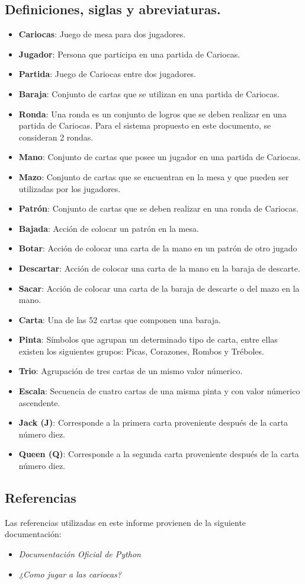 \subsection{Definiciones, siglas y abreviaturas.}\label{cap:definiciones} 
\begin{itemize}
    \item \textbf{Cariocas}: Juego de mesa para dos jugadores.
    \item \textbf{Jugador}: Persona que participa en una partida de Cariocas.
    \item \textbf{Partida}: Juego de Cariocas entre dos jugadores.
    \item \textbf{Baraja}: Conjunto de cartas que se utilizan en una partida de Cariocas.
    \item \textbf{Ronda}: Una ronda es un conjunto de logros que se deben realizar en una partida de Cariocas. Para el sistema propuesto en este documento, se consideran 2 rondas.
    \item \textbf{Mano}: Conjunto de cartas que posee un jugador en una partida de Cariocas.
    \item \textbf{Mazo}: Conjunto de cartas que se encuentran en la mesa y que pueden ser utilizadas por los jugadores.
    \item \textbf{Patrón}: Conjunto de cartas que se deben realizar en una ronda de Cariocas.
    \item \textbf{Bajada}: Acción de colocar un patrón en la mesa.
    \item \textbf{Botar}: Acción de colocar una carta de la mano en un patrón de otro jugado
    \item \textbf{Descartar}: Acción de colocar una carta de la mano en la baraja de descarte.
    \item \textbf{Sacar}: Acción de colocar una carta de la baraja de descarte o del mazo en la mano.
    \item \textbf{Carta}: Una de las 52 cartas que componen una baraja.
    \item \textbf{Pinta}: Símbolos que agrupan un determinado tipo de carta, entre ellas existen los siguientes grupos: Picas, Corazones, Rombos y Tréboles.
    \item \textbf{Trio}: Agrupación de tres cartas de un mismo valor númerico.
    \item \textbf{Escala}: Secuencia de cuatro cartas de una misma pinta y con valor númerico ascendente.
    \item \textbf{Jack (J)}: Corresponde a la primera carta proveniente después de la carta número diez.
    \item \textbf{Queen (Q)}: Corresponde a la segunda carta proveniente después de la carta número diez.
\end{itemize} 

\subsection{Referencias}
Las referencias utilizadas en este informe provienen de la siguiente documentación:
\begin{itemize}
    \item \textit{Documentación Oficial de Python} \cite{python}
    \item \textit{¿Como jugar a las cariocas?} \cite{cariocas}
\end{itemize}
